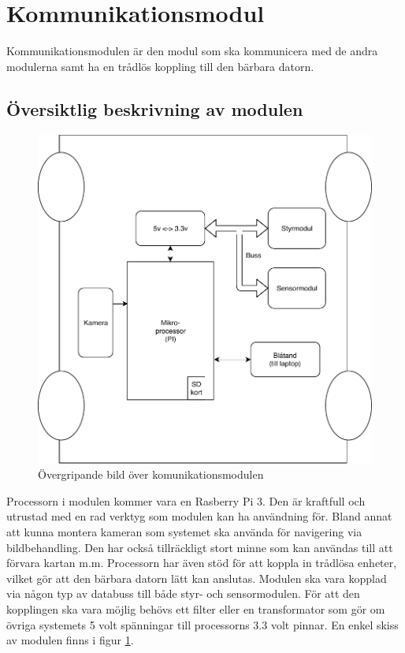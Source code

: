 \documentclass[systemskiss/skiss.tex]{subfiles}
\begin{document}
\section{Kommunikationsmodul}
Kommunikationsmodulen är den modul som ska kommunicera med de andra modulerna samt ha en trådlös koppling till den bärbara datorn. 
\subsection{Översiktlig beskrivning av modulen}
\begin{figure}[h]
    \centering
    \includegraphics[width=0.6\linewidth]{systemskiss/figures/kommodul.pdf}
    \caption{Övergripande bild över komunikationsmodulen}
    \label{fig:komskiss}
\end{figure}
\noindent
Processorn i modulen kommer vara en Rasberry Pi 3. Den är kraftfull och utrustad med en rad verktyg som modulen kan ha användning för. Bland annat att kunna montera kameran som systemet ska använda för navigering via bildbehandling. Den har också tillräckligt stort minne som kan användas till att förvara kartan m.m. Processorn har även stöd för att koppla in trådlösa enheter, vilket gör att den bärbara datorn lätt kan anslutas. Modulen ska vara kopplad via någon typ av databuss till både styr- och sensormodulen. För att den kopplingen  ska vara möjlig behövs ett filter eller en transformator som gör om övriga systemets 5 volt spänningar till processorns 3.3 volt pinnar. En enkel skiss av modulen finns i figur \ref{fig:komskiss}.
\end{document}
